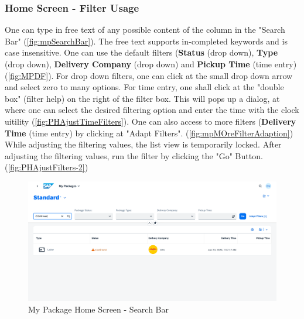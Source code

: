 \subsubsection{Home Screen - Filter Usage}
One can type in free text of any possible content of the column in the "Search Bar" (\autoref{fig:mpSearchBar}). The free text supports in-completed keywords and is case insensitive. 
One can use the default filters (\textbf{Status} (drop down), \textbf{Type} (drop down), \textbf{Delivery Company} (drop down) and \textbf{Pickup Time} (time entry) (\autoref{fig:MPDF}). For drop down filters, one can click at the small drop down arrow and select zero to many options. For time entry, one shall click at the "double box" (filter help) on the right of the filter box. This will pops up a dialog, at where one can select the desired filtering option and enter the time with the clock uitility (\autoref{fig:PHAjustTimeFilters}). One can also access to more filters (\textbf{Delivery Time} (time entry) by clicking at "Adapt Filters". (\autoref{fig:mpMOreFilterAdaption}) While adjusting the filtering values, the list view is temporarily locked. After adjusting the filtering values, run the filter by clicking the "Go" Button. (\autoref{fig:PHAjustFilters-2})

\begin{figure}[H]
	\centering
	\includegraphics[width=1\linewidth]{images/user_doc/myPack/searchbar.png}
	\caption{My Package Home Screen - Search Bar}
	\label{fig:mpSearchBar}
\end{figure}


